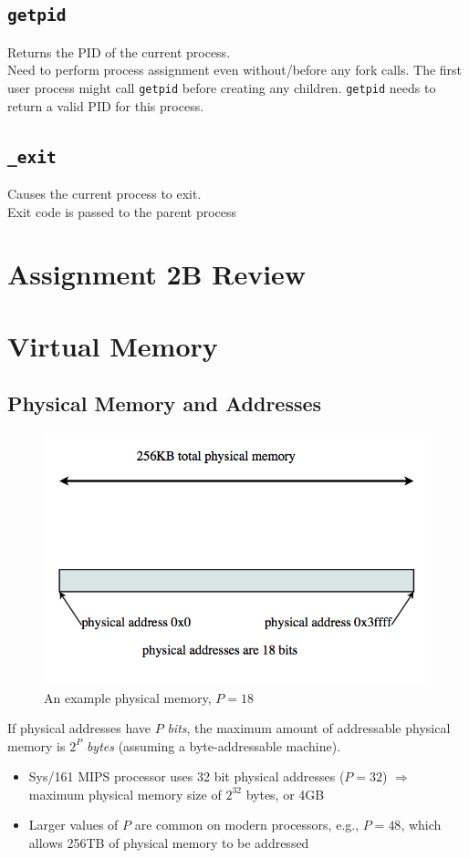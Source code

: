 \documentclass[12pt]{article}
\theoremstyle{plain}
\theoremstyle{definition}
\begin{document}
\subsection{\texttt{getpid}}
Returns the PID of the current process. \\
Need to perform process assignment even without/before any fork calls.
The first user process might call \texttt{getpid} before creating any children.
\texttt{getpid} needs to return a valid PID for this process.

\subsection{\texttt{\_exit}}
Causes the current process to exit. \\
Exit code is passed to the parent process

\newpage
\section{Assignment 2B Review}

\newpage
\section{Virtual Memory}
\subsection{Physical Memory and Addresses}
\begin{figure}[!h]
  \centering
  \includegraphics[scale=0.65]{pictures/phys_mem.png}
  \caption{An example physical memory, $P = 18$}
  \label{fig:phys_mem}
\end{figure}
If physical addresses have $P$ \emph{bits}, the maximum amount of addressable physical memory is $2^{P}$ \emph{bytes} (assuming a byte-addressable machine).
\begin{itemize}
  \item Sys/161 MIPS processor uses 32 bit physical addresses ($P = 32$) $\Rightarrow$ maximum physical memory size of $2^32$ bytes, or 4GB
  \item Larger values of $P$ are common on modern processors, e.g., $P = 48$, which allows 256TB of physical memory to be addressed
\end{itemize}
\end{document}
